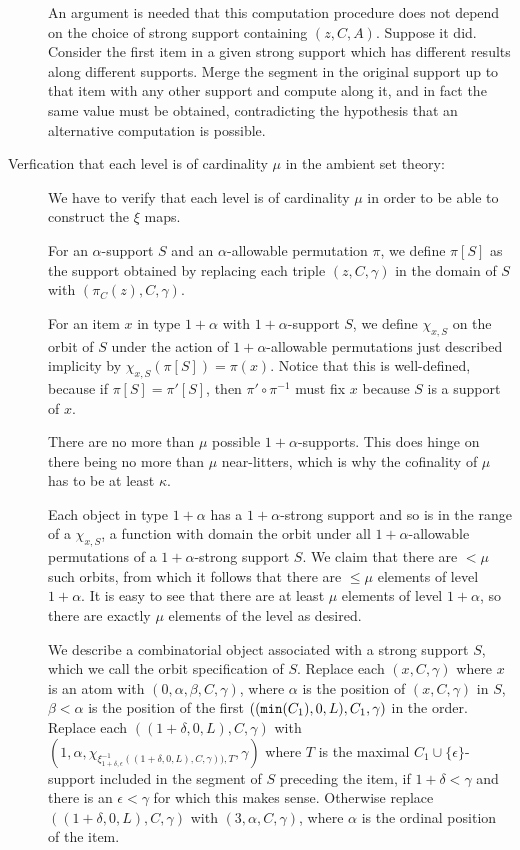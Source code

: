 \documentclass[12pt]{article}
\begin{document}
\begin{description}
An argument is needed that this computation procedure does not depend on the choice of strong support containing $(z,C,A)$.  Suppose it did.  Consider the first item in a given strong support which has different results along different supports.  Merge the segment in the original support up to that item with any other support and compute along it, and in fact
the same value must be obtained, contradicting the hypothesis that an alternative computation is possible.

\item[Verfication that each level is of cardinality $\mu$ in the ambient set theory:]

We have to verify that each level is of cardinality $\mu$ in order to be able to construct the $\xi$ maps.

For an $\alpha$-support $S$ and an $\alpha$-allowable permutation $\pi$, we define $\pi[S]$ as the support obtained by replacing each triple $(z,C,\gamma)$ in the domain of $S$
with $(\pi_C(z),C,\gamma)$.

For an item $x$ in type $1+\alpha$ with $1+\alpha$-support $S$, we define $\chi_{x,S}$ on the orbit of $S$ under the action of $1+\alpha$-allowable permutations just
described implicity by $\chi_{x,S}(\pi[S]) = \pi(x)$.  Notice that this is well-defined, because if $\pi[S] = \pi'[S]$, then $\pi'\circ \pi^{-1}$ must fix $x$ because $S$ is a support of $x$.

There are no more than $\mu$ possible $1+\alpha$-supports.  This does hinge on there being no more than $\mu$ near-litters, which is why the cofinality of $\mu$ has to be at least $\kappa$.

Each object in type $1+\alpha$ has a $1+\alpha$-strong support and so is in the range of a $\chi_{x,S}$, a function with domain the orbit under all $1+\alpha$-allowable permutations
of a $1+\alpha$-strong support $S$.  We claim that there are $<\mu$ such orbits, from which it follows that there are $\leq \mu$ elements of level $1+\alpha$.  It is easy to see that there are at least
$\mu$ elements of level $1+\alpha$, so there are exactly $\mu$ elements of the level as desired.

We describe a combinatorial object associated with a strong support $S$, which we call the orbit specification of $S$.  Replace each $(x,C,\gamma)$ where $x$ is an atom with $(0,\alpha,\beta,C,\gamma)$, where
$\alpha$ is the position of $(x,C,\gamma)$ in $S$, $\beta<\alpha$ is the position of the first $(({\tt min}(C_1),0,L),C_1,\gamma)$  in the order.  Replace each
$((1+\delta,0,L),C,\gamma)$ with $(1,\alpha,\chi_{\xi^{-1}_{1+\delta,\epsilon}((1+\delta,0,L),C,\gamma)),T},\gamma)$ where $T$ is the maximal $C_1 \cup \{\epsilon\}$-support
included in the segment of $S$ preceding the item, if $1+\delta<\gamma$ and there is an $\epsilon<\gamma$ for which this makes sense.  Otherwise replace $((1+\delta,0,L),C,\gamma)$ with $(3,\alpha,C,\gamma)$, where $\alpha$ is the ordinal position of the item.


\end{description}
\end{document}
